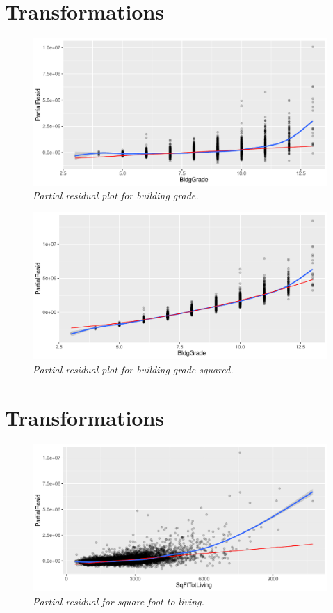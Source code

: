 \documentclass[12pt,letterpaper]{article}
\begin{document}
\newpage
\section{Transformations}
\begin{figure}[!h]
	\includegraphics[width= 150mm]{BldgPartialRegRplot}
	\caption{\small \sl Partial residual plot for building grade.\label{fig:Stupendous}} 
\end{figure}

\begin{figure}[!h]
	\includegraphics[width= 150mm]{BlG^2ParRegRplot}
	\caption{\small \sl Partial residual plot for building grade squared.\label{fig:Stupendous}} 
\end{figure}

\newpage
\section*{Transformations}
\begin{figure}[!h]
	\includegraphics[width= 150mm]{SqrftlParRegRplot}
	\caption{\small \sl Partial residual for square foot to living.\label{fig:Stupendous}} 
\end{figure}
\end{document}
